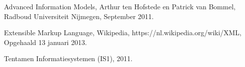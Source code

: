 \documentclass[11pt]{article}
\begin{document}
\begin{thebibliography}{9}
    Advanced Information Models, 
    Arthur ten Hofstede en Patrick van Bommel,
    Radboud Universiteit Nijmegen,
    September 2011.

    Extensible Markup Language,
    Wikipedia,
    https://nl.wikipedia.org/wiki/XML,
    Opgehaald 13 januari 2013.

    Tentamen Informatiesystemen (IS1), 2011.
\end{thebibliography}
\end{document}
